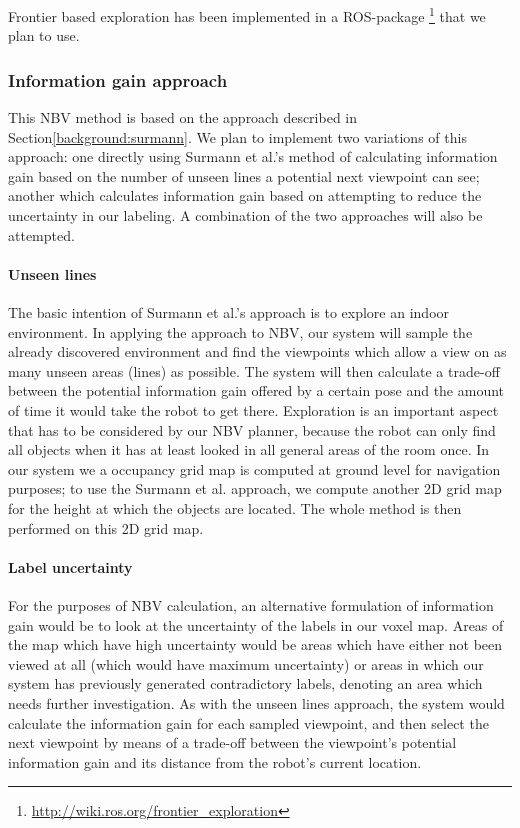 \documentclass[a4paper,11pt,english]{article}
\begin{document}
Frontier based exploration has been implemented in a ROS-package \footnote{\url{http://wiki.ros.org/frontier_exploration}} that we plan to use.

\subsubsection{Information gain approach}
This NBV method is based on the approach described in Section\ref{background:surmann}.
We plan to implement two variations of this approach: one directly using Surmann et al.'s method of calculating information gain based on the number of unseen lines a potential next viewpoint can see; another which calculates information gain based on attempting to reduce the uncertainty in our labeling.
A combination of the two approaches will also be attempted.

\paragraph{Unseen lines}
The basic intention of Surmann et al.'s approach is to explore an indoor environment.
In applying the approach to NBV, our system will sample the already discovered environment and find the viewpoints which allow a view on as many unseen areas (lines) as possible.
The system will then calculate a trade-off between the potential information gain offered by a certain pose and the amount of time it would take the robot to get there.
Exploration is an important aspect that has to be considered by our NBV planner, because the robot can only find all objects when it has at least looked in all general areas of the room once.
In our system we a occupancy grid map is computed at ground level for navigation purposes; to use the Surmann et al. approach, we compute another 2D grid map for the height at which the objects are located.
The whole method is then performed on this 2D grid map.

\paragraph{Label uncertainty}
For the purposes of NBV calculation, an alternative formulation of information gain would be to look at the uncertainty of the labels in our voxel map.
Areas of the map which have high uncertainty would be areas which have either not been viewed at all (which would have maximum uncertainty) or areas in which our system has previously generated contradictory labels, denoting an area which needs further investigation.
As with the unseen lines approach, the system would calculate the information gain for each sampled viewpoint, and then select the next viewpoint by means of a trade-off between the viewpoint's potential information gain and its distance from the robot's current location.
\end{document}
